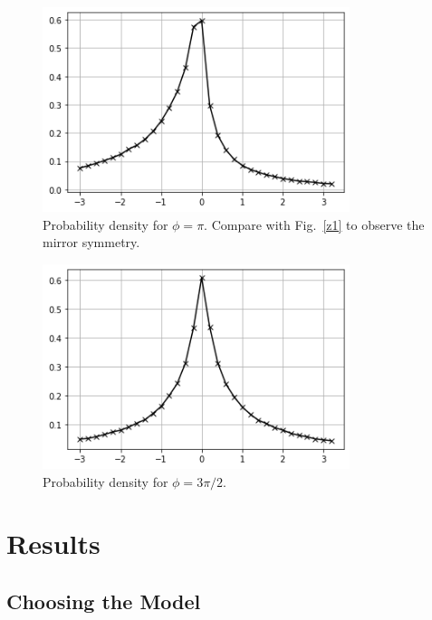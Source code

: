\documentclass[twoside]{article}
\begin{document}
\begin{figure}
\centering
\includegraphics[width=0.8\textwidth]{3.png}
\caption[]{ 
  Probability density  for $\phi = \pi$. Compare with
 Fig.~\ref{z1} to observe the mirror symmetry.
  }
\vspace{1mm}
\label{z3}
\end{figure}

\begin{figure}
\centering
\includegraphics[width=0.8\textwidth]{4.png}
\caption[]{ 
  Probability density  for $\phi = 3\pi/2$. 
  }
\vspace{1mm}
\label{z4}
\end{figure}



\section{\label{sec3}Results}

\subsection{\label{sec3.1} Choosing the Model}
\end{document}
